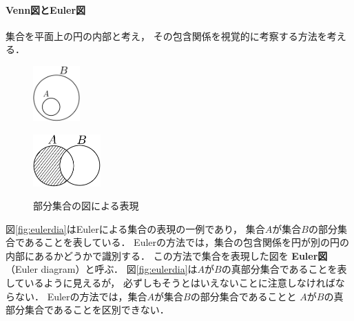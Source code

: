   \paragraph{Venn図とEuler図}
   集合を平面上の円の内部と考え，
   その包含関係を視覚的に考察する方法を考える．

  \begin{figure}[h]
     \begin{minipage}[b]{0.45\linewidth}
       \centering
       \includegraphics[width=1.8cm]{inputyou/set/picture/seteulerdia.pdf}
        \label{fig:eulerdia}
     \end{minipage}
     \begin{minipage}[b]{0.45\linewidth}
       \centering
       \includegraphics[width=2.6cm]{inputyou/set/picture/setvenndia.pdf}
        \label{fig:venndia}
     \end{minipage}
     \caption{部分集合の図による表現}
     \label{fig:eulervenndia}
   \end{figure}

   図\ref{fig:eulerdia}はEulerによる集合の表現の一例であり，
   集合$A$が集合$B$の部分集合であることを表している．
   Eulerの方法では，集合の包含関係を円が別の円の内部にあるかどうかで識別する．
   この方法で集合を表現した図を
   \textbf{Euler図}（Euler diagram）と呼ぶ．
   図\ref{fig:eulerdia}は$A$が$B$の真部分集合であることを表しているように見えるが，
   必ずしもそうとはいえないことに注意しなければならない．
   Eulerの方法では，集合$A$が集合$B$の部分集合であることと
   $A$が$B$の真部分集合であることを区別できない．
   
